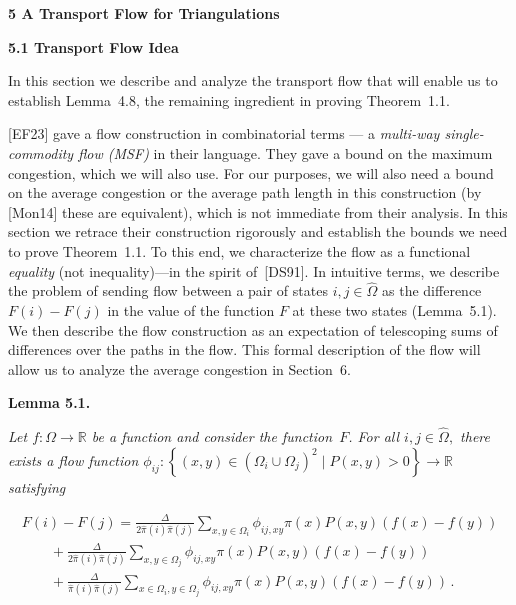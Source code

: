 \par\medskip\noindent\textbf{5 A Transport Flow for Triangulations}\par




\par\medskip\noindent\textbf{5.1 Transport Flow Idea}\par




In this section we describe and analyze the transport flow that will enable us to establish Lemma 4.8,
the remaining ingredient in proving Theorem 1.1.\par




[EF23] gave a flow construction in combinatorial terms — a \emph{multi-way single-commodity flow (MSF)} in their language. They gave a bound on the maximum congestion, which we will also use. For our purposes, we will also need a bound on the average congestion or the average path length in this construction (by [Mon14] these are equivalent), which is not immediate from their analysis. In this section we retrace their construction rigorously and establish the bounds we need to prove Theorem 1.1. To this end, we characterize the flow as a functional \emph{equality} (not inequality)—in the spirit of [DS91]. In intuitive terms, we describe the problem of sending flow between a pair of states $i,j\in\hat{\Omega}$ as the difference $F(i)-F(j)$ in the value of the function $F$ at these two states (Lemma 5.1). We then describe the flow construction as an expectation of telescoping sums of differences over the paths in the flow. This formal description of the flow will allow us to analyze the average congestion in Section 6.\par





\par\medskip\noindent\textbf{\textbf{Lemma 5.1}\textbf{.}}\par



\emph{Let $f:\Omega\rightarrow\mathbb{R}$ be a function and consider the function $F$. For all $i,j\in\hat{\Omega},$ there exists a flow function $\phi_{ij}:\left\{(x,y)\in(\Omega_{i}\cup\Omega_{j})^{2}\mid P(x,y)>0\right\}\rightarrow\mathbb{R}$ satisfying}\par




\[\begin{gathered}
\displaystyle F(i)-F(j) \displaystyle=\frac{\Delta}{2\hat{\pi}(i)\hat{\pi}(j)}\sum_{x,y\in\Omega_{i}}\phi_{ij,xy}\pi(x)P(x,y)(f(x)-f(y)) \\
\displaystyle\qquad+\frac{\Delta}{2\hat{\pi}(i)\hat{\pi}(j)}\sum_{x,y\in\Omega_{j}}\phi_{ij,xy}\pi(x)P(x,y)(f(x)-f(y)) \\
\displaystyle\qquad+\frac{\Delta}{\hat{\pi}(i)\hat{\pi}(j)}\sum_{x\in\Omega_{i},y\in\Omega_{j}}\phi_{ij,xy}\pi(x)P(x,y)(f(x)-f(y))\,.
\end{gathered}\]


